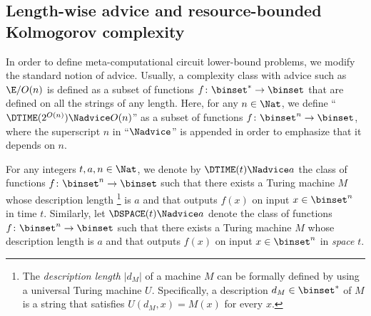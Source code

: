 \documentclass{toc}
\begin{document}
\subsection{Length-wise advice and resource-bounded Kolmogorov complexity}
\label{section_MCLPdef}

In order to define meta-computational circuit lower-bound problems,
we modify the standard notion of advice.
Usually, a complexity class with advice such as $\E / O(n)$ is defined as a subset of functions $f \colon \binset^* \to \binset$ that are defined on all the strings of any length.
Here,
for any $n \in \Nat$,
we define
``$\DTIME(2^{O(n)}) \Nadvice O(n)$'' as a subset of functions $f \colon \binset^n \to \binset$,
where the superscript $n$ in ``$\Nadvice$'' is appended in order to emphasize that it depends on $n$.
\begin{definition}
  \label{def_AdviceLengthwise}
  For any integers $t, a, n \in \Nat$,
  we denote by $\DTIME(t) \Nadvice a$ the class of functions $f \colon \binset^n \to \binset$
  such that
  there exists a Turing machine $M$ whose description length%
  \footnote{%
    The \emph{description length} $|d_M|$ of a machine $M$ can be formally defined by using a universal Turing machine $U$.  Specifically, a description $d_M \in \binset^*$ of $M$
    is a string that satisfies $U(d_M, x) = M(x)$ for every $x$.}
  is $a$
  and
  that outputs $f(x)$ on input $x \in \binset^n$ in time $t$.
  Similarly, let $\DSPACE(t) \Nadvice a$ denote the class of functions $f \colon \binset^n \to \binset$
  such that
  there exists a Turing machine $M$ whose description length
  is $a$
  and
  that outputs $f(x)$ on input $x \in \binset^n$ in \emph{space} $t$.
\end{definition}

%
%
%
%
%
%
%
%
%
%
%
\end{document}
